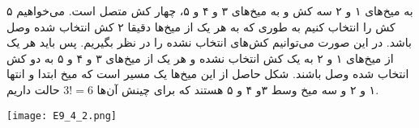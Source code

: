 به میخ‌های ۱ و ۲ سه کش و به میخ‌های ۳ و ۴ و ۵، چهار کش متصل است. می‌خواهیم ۵ کش را انتخاب کنیم به طوری که به هر یک از میخ‌ها دقیقا ۲ کش انتخاب شده وصل باشد. در این صورت می‌توانیم کش‌های انتخاب نشده را در نظر بگیریم. 
پس باید هر یک از میخ‌های ۱ و ۲ به یک کش انتخاب نشده و هر یک از میخ‌های ۳ و ۴ و ۵ به دو کش انتخاب شده وصل باشند.
شکل حاصل از این میخ‌ها یک مسیر است که میخ ابتدا و انتها ۱ و ۲ و سه میخ وسط ۳و ۴ و ۵ هستند که برای چینش آن‌ها
$3! = 6$
حالت داریم.
\begin{center}
  \texttt{[image: E9\_4\_2.png]}
\end{center}